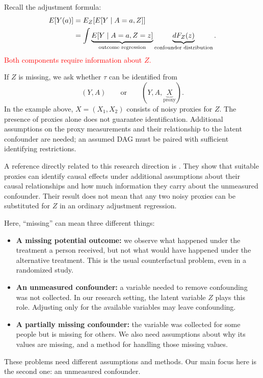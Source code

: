 \documentclass[11pt,twoside]{article}
\begin{document}
Recall the adjustment formula:
\begin{align}
\label{eq:missing-confounder-formula}
    E[Y(a)]
    &= E_Z\!\left[E[Y\mid A=a,Z]\right] \notag\\
    &= \int
       \underbrace{E[Y\mid A=a,Z=z]}_{\text{outcome regression}}
       \underbrace{dF_Z(z)}_{\text{confounder distribution}}.
\end{align}
\textcolor{red}{Both components require information about $Z$.}

If $Z$ is missing, we ask whether $\tau$ can be identified from
\[
    (Y,A)
    \qquad\text{or}\qquad
    (Y,A,\underbrace{X}_{\text{proxy}}).
\]
In the example above, $X=(X_1,X_2)$ consists of noisy proxies for $Z$.
The presence of proxies alone does not guarantee identification. Additional assumptions on the proxy measurements and their relationship to the latent confounder are needed; an assumed DAG must be paired with sufficient identifying restrictions.

A reference directly related to this research direction is \cite{miao2018proxy}. They show that suitable proxies can identify causal effects under additional assumptions about their causal relationships and how much information they carry about the unmeasured confounder. Their result does not mean that any two noisy proxies can be substituted for $Z$ in an ordinary adjustment regression.

\begin{remark}
Here, ``missing'' can mean three different things:
\begin{itemize}
 \item \textbf{A missing potential outcome:} we observe what happened under the treatment a person received, but not what would have happened under the alternative treatment. This is the usual counterfactual problem, even in a randomized study.
 \item \textbf{An unmeasured confounder:} a variable needed to remove confounding was not collected. In our research setting, the latent variable $Z$ plays this role. Adjusting only for the available variables may leave confounding.
 \item \textbf{A partially missing confounder:} the variable was collected for some people but is missing for others. We also need assumptions about why its values are missing, and a method for handling those missing values.
\end{itemize}
These problems need different assumptions and methods. Our main focus here is the second one: an unmeasured confounder.
\end{remark}
\end{document}
